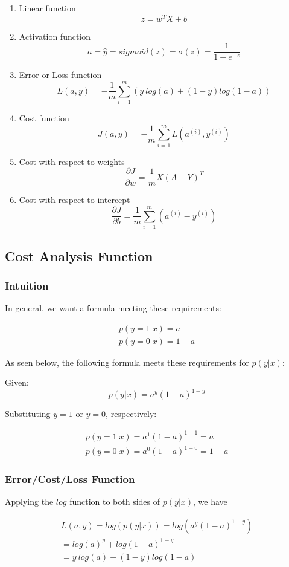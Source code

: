 \documentclass{article}
\begin{document}
\begin{enumerate}
\item Linear function
$$z = w^T X + b$$
\item Activation function
$$a = \hat{y} = sigmoid(z) = \sigma(z) = \frac{1}{1 + e^{-z}}$$
\item Error or Loss function
$$L(a,y) = -\frac{1}{m} \sum_{i=1}^{m} (y\ log(a) + (1-y) log(1-a))$$
\item Cost function
$$J(a,y) = -\frac{1}{m} \sum_{i=1}^{m} L(a^{(i)},y^{(i)})$$
\item Cost with respect to weights
$$\frac{\partial{J}}{\partial{w}} = \frac{1}{m}X(A-Y)^{T}$$
\item Cost with respect to intercept
$$\frac{\partial{J}}{\partial{b}} = \frac{1}{m} \sum_{i=1}^{m}(a^{(i)} - y^{(i)})$$
\end{enumerate}

\subsection{Cost Analysis Function}

\subsubsection{Intuition}

In general, we want a formula meeting these requirements:

\begin{gather}
p(y=1|x) = a \\
p(y=0|x) = 1 - a
\end{gather}

As seen below, the following formula meets these requirements for $p(y | x)$:

Given:
$$p(y|x) = a^{y}(1-a)^{1-y}$$

Substituting $y=1$ or $y=0$, respectively:

\begin{gather}
p(y=1|x) = a^{1}(1-a)^{1-1} = a \\
p(y=0|x) = a^{0}(1-a)^{1-0} = 1-a
\end{gather}

\subsubsection{Error/Cost/Loss Function}

Applying the $log$ function to both sides of $p(y | x)$, we have

\begin{gather}
L(a,y) = log(p(y|x)) = log(a^{y}(1-a)^{1-y}) \\
= log(a)^y + log (1-a)^{1-y} \\
= y\ log(a) + (1-y) log (1-a)
\end{gather}
\end{document}
